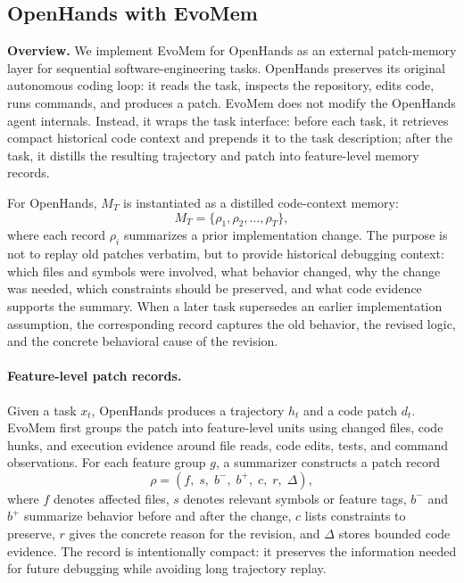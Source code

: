 \documentclass{llmxive}
\begin{document}
\subsection{OpenHands with EvoMem}
\label{sec:evomem_openhands}

\textbf{Overview.}
We implement EvoMem for OpenHands as an external patch-memory layer for sequential software-engineering tasks. OpenHands preserves its original autonomous coding loop: it reads the task, inspects the repository, edits code, runs commands, and produces a patch. EvoMem does not modify the OpenHands agent internals. Instead, it wraps the task interface: before each task, it retrieves compact historical code context and prepends it to the task description; after the task, it distills the resulting trajectory and patch into feature-level memory records.

For OpenHands, $M_T$ is instantiated as a distilled code-context memory:
\[
M_T=\{\rho_1,\rho_2,\ldots,\rho_T\},
\]
where each record $\rho_i$ summarizes a prior implementation change. The purpose is not to replay old patches verbatim, but to provide historical debugging context: which files and symbols were involved, what behavior changed, why the change was needed, which constraints should be preserved, and what code evidence supports the summary. When a later task supersedes an earlier implementation assumption, the corresponding record captures the old behavior, the revised logic, and the concrete behavioral cause of the revision.

\paragraph{Feature-level patch records.}
Given a task $x_t$, OpenHands produces a trajectory $h_t$ and a code patch $d_t$. EvoMem first groups the patch into feature-level units using changed files, code hunks, and execution evidence around file reads, code edits, tests, and command observations. For each feature group $g$, a summarizer constructs a patch record
\[
\rho =
\left(
f,\; s,\; b^{-},\; b^{+},\; c,\; r,\; \Delta
\right),
\]
where $f$ denotes affected files, $s$ denotes relevant symbols or feature tags, $b^{-}$ and $b^{+}$ summarize behavior before and after the change, $c$ lists constraints to preserve, $r$ gives the concrete reason for the revision, and $\Delta$ stores bounded code evidence. The record is intentionally compact: it preserves the information needed for future debugging while avoiding long trajectory replay.
\end{document}
